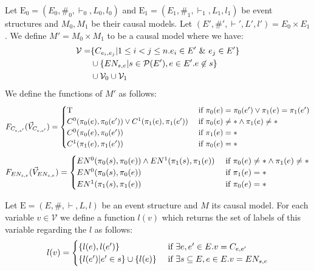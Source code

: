 \begin{definition}
    Let $\mathrm{E}_0 = (E_0,\#_0,\vdash_0,L_0,l_0)$ and
    $\mathrm{E}_1 = (E_1,\#_1,\vdash_1,L_1,l_1)$ be event structures and
    $M_0,M_1$ be their causal models.
    Let $(E',\#',\vdash',L',l') = E_0 \times E_1$.
    We define $M' = M_0 \times M_1$ to be a causal model where we have:
    \begin{align*}
        \mathcal{V} = & \{C_{e_i,e_j} |  1 \leq i < j \leq n.
        e_i \in E' \ \& \  e_j \in E'\}                               \\
                      & \cup \{EN_{s,e} | s \in \mathcal{P}(E'),
        e \in E'. e \not \in s \}                                  \\
                      & \cup \mathcal{V}_0 \cup \mathcal{V}_1
    \end{align*}
    We define the functions of $M'$ as follows:
    $$
        F_{C_{e,e'}}(\vec V_{C_{e,e'}}) = \begin{cases}
            \mathrm{T} & \text{ if } \pi_0(e) = \pi_0(e') \vee \pi_1(e) = \pi_1(e') \\
            C^0(\pi_0(e),\pi_0(e')) \vee  C^1(\pi_1(e),\pi_1(e'))
               & \text { if } \pi_0(e) \neq * \wedge \pi_1(e) \neq *        \\
            C^0(\pi_0(e),\pi_0(e'))
               & \text { if } \pi_1(e) = *                                  \\
            C^1(\pi_1(e),\pi_1(e'))
               & \text { if } \pi_0(e) = *                                  \\
        \end{cases}
    $$
    $$
        F_{EN_{s,e}}(\vec V_{EN_{s,e}}) = \begin{cases}
            EN^0(\pi_0(s),\pi_0(e)) \wedge EN^1(\pi_1(s),\pi_1(e))
                                    & \text{ if } \pi_0(e) \neq * \wedge \pi_1(e) \neq * \\
            EN^0(\pi_0(s),\pi_0(e)) & \text{ if } \pi_1(e) = *                           \\
            EN^1(\pi_1(s),\pi_1(e)) & \text{ if } \pi_0(e) = *                           \\
        \end{cases}
    $$
\end{definition}
\begin{definition}
    Let $\mathrm{E} = (E,\#,\vdash,L,l)$ be an event structure and $M$ its
    causal model.
    For each variable $v \in \mathcal{V}$ we define a function $l(v)$ which
    returns the set of labels of this variable regarding the $l$ as follows:
    $$
        l(v) = \begin{cases}
            \{l(e),l(e')\}                     & \text{ if } \exists e,e' \in E. v = C_{e,e'} \\
            \{l(e')| e' \in s \} \cup \{l(e)\} & \text{ if }
            \exists s \subseteq E, e \in E. v = EN_{s,e}
        \end{cases}
    $$
\end{definition}

